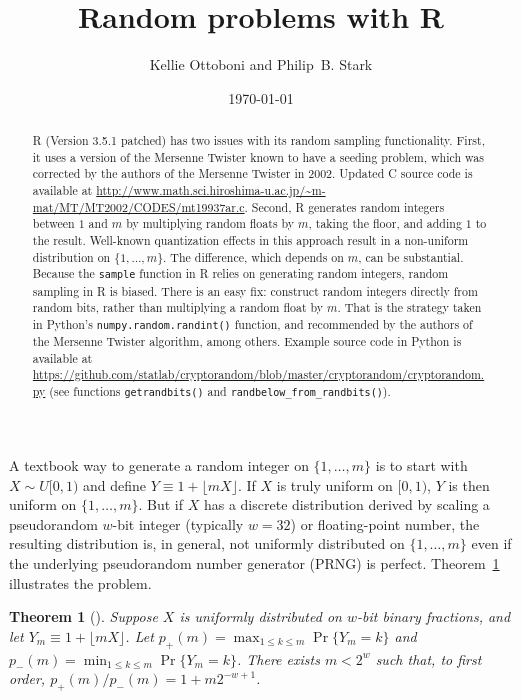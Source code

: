 \documentclass[12pt]{article}
\title{Random problems with R}
\author{Kellie Ottoboni and Philip~B. Stark}
\date{\today}
\newtheorem{theorem}{Theorem}
\begin{document}
\maketitle


\begin{abstract}
\noindent R (Version 3.5.1 patched) has two issues with its random sampling functionality.
First, it uses a version of the Mersenne Twister known to have
a seeding problem, which was corrected by the authors of the Mersenne Twister in 2002.
Updated C source code is available at \url{http://www.math.sci.hiroshima-u.ac.jp/~m-mat/MT/MT2002/CODES/mt19937ar.c}.
Second, R generates random integers between $1$ and $m$
by multiplying random floats by $m$, taking the floor, and adding $1$ to the result.
Well-known quantization effects in this approach result in a 
non-uniform distribution on $\{ 1, \ldots, m\}$.
The difference, which depends on $m$, can be substantial.
Because the \texttt{sample} function in R relies on generating random integers,
random sampling in R is biased.
There is an easy fix: construct random integers directly from random bits, rather than
multiplying a random float by $m$.
That is the strategy taken in Python's \texttt{numpy.random.randint()} function, 
and recommended by the authors of the Mersenne Twister algorithm, among
others.
Example source code in Python is available at \url{https://github.com/statlab/cryptorandom/blob/master/cryptorandom/cryptorandom.py} (see functions \texttt{getrandbits()} and \texttt{randbelow\_from\_randbits()}).
\end{abstract}



A textbook way to generate a random integer on 
$\{1, \dots, m\}$ is to start with $X \sim U[0,1)$ and define $Y \equiv 1 + \lfloor mX \rfloor$. 
If $X$ is truly uniform on $[0,1)$, $Y$ is then uniform on $\{1, \dots, m\}$.
But if $X$ has a discrete distribution derived by scaling a pseudorandom $w$-bit integer
(typically $w=32$) or floating-point number, 
the resulting distribution is, in general, not uniformly distributed on 
$\{1, \ldots, m \}$ even if the underlying pseudorandom number generator 
(PRNG) is perfect.
Theorem~\ref{thm:theorem_1} illustrates the problem.

\begin{theorem}[\citet{knuth_art_1997}] %
\label{thm:theorem_1}
Suppose $X$ is uniformly distributed on $w$-bit binary fractions, and
let $Y_m \equiv 1 + \lfloor mX \rfloor$.
Let $p_+(m) = \max_{1 \le k \le m} \Pr\{Y_m = k\}$ and $p_-(m) = \min_{1 \le k \le m} \Pr\{Y_m = k\}$.
There exists $m < 2^w$ such that, to first order, 
$p_+(m)/p_-(m) = 1 + m2^{-w+1}$.
\end{theorem}
\end{document}
